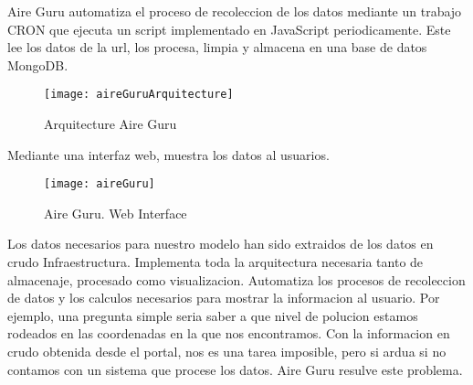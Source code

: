 Aire Guru automatiza el proceso de recoleccion de los datos mediante un trabajo CRON que ejecuta un script implementado en JavaScript periodicamente. Este lee 
los datos de la url, los procesa, limpia y almacena en una base de datos MongoDB.

\begin{figure}[ht]
    \centering
    \texttt{[image: aireGuruArquitecture]}
    \caption{Arquitecture Aire Guru}
\end{figure}

Mediante una interfaz web, muestra los datos al usuarios.

\begin{figure}[ht]
    \centering
    \texttt{[image: aireGuru]}
    \caption{Aire Guru. Web Interface}
\end{figure}

\begin{itemize}
  \done Los datos necesarios para nuestro modelo han sido extraidos de los datos en crudo
\done Infraestructura. Implementa toda la arquitectura necesaria tanto de almacenaje, procesado como visualizacion.
\done Automatiza los procesos de recoleccion de datos y los calculos necesarios para mostrar la informacion al usuario. Por ejemplo, una pregunta simple 
seria saber a que nivel de polucion estamos rodeados en las coordenadas en la que nos encontramos. Con la informacion en crudo obtenida desde el portal, 
nos es una tarea imposible, pero si ardua si no contamos con un sistema que procese los datos. Aire Guru resulve este problema.
\end{itemize}